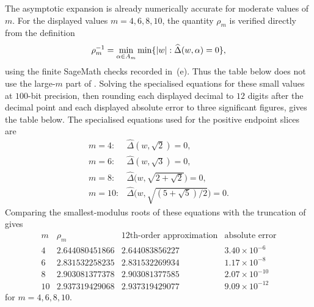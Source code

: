 \begin{remark}

The asymptotic expansion is already numerically accurate for moderate
values of \(m\). For the displayed values \(m=4,6,8,10\), the quantity
\(\rho_m\) is verified directly from the definition
\[
  \rho_m^{-1}=\min_{\alpha\in A_m}\min\{\lvert w \rvert:\widehat\Delta(w,\alpha)=0\},
\]
using the finite SageMath checks recorded in
\,\textup{(e)}. Thus the table below does
not use the large-\(m\) part of . Solving the
specialised equations for these small values at \(100\)-bit precision,
then rounding each displayed decimal to \(12\) digits after the decimal
point and each displayed absolute error to three significant figures,
gives the table below.
The specialised equations used for the positive endpoint slices are
\[
\begin{array}{ll}
m=4:  & \widehat\Delta(w,\sqrt2)=0,\\
m=6:  & \widehat\Delta(w,\sqrt3)=0,\\
m=8:  & \widehat\Delta\bigl(w,\sqrt{2+\sqrt2}\bigr)=0,\\
m=10: & \widehat\Delta\bigl(w,\sqrt{(5+\sqrt5)/2}\bigr)=0.
\end{array}
\]
Comparing the smallest-modulus roots of these equations with the
truncation of
 gives
\[
  \begin{array}{c|c|c|c}
    m & \rho_m & \text{12th-order approximation} & \text{absolute error} \\
    \hline
    4  & 2.644080451866 & 2.644083856227 & 3.40\times 10^{-6} \\
    6  & 2.831532258235 & 2.831532269934 & 1.17\times 10^{-8} \\
    8  & 2.903081377378 & 2.903081377585 & 2.07\times 10^{-10} \\
    10 & 2.937319429068 & 2.937319429077 & 9.09\times 10^{-12}
  \end{array}
\]
for \(m=4,6,8,10\).

\end{remark}










